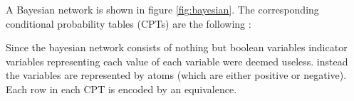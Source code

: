 \begin{figure*}
\caption{Bayesian network representing the ground acyclic program.}
\label{fig:bayesian}
\end{figure*}

A Bayesian network is shown in figure \ref{fig:bayesian}. The corresponding conditional probability tables (CPTs) are the following :



Since the bayesian network consists of nothing but boolean variables indicator variables representing each value of each variable were deemed useless. instead the variables are represented by atoms (which are either positive or negative). Each row in each CPT is encoded by an equivalence.


